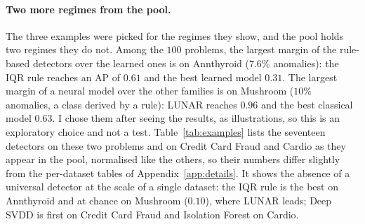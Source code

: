 \documentclass[conference]{IEEEtran}
\begin{document}
\paragraph{Two more regimes from the pool.} The three examples were
picked for the regimes they show, and the pool holds two regimes they do not. Among the
$100$ problems, the largest margin of the rule-based detectors over the learned ones is on
Annthyroid ($7.6\%$ anomalies): the IQR rule reaches an AP of $0.61$ and the best learned
model $0.31$. The largest margin of a neural model over the other families is on Mushroom
($10\%$ anomalies, a class derived by a rule): LUNAR reaches $0.96$ and the best classical
model $0.63$. I chose them after seeing the results, as illustrations, so this is an
exploratory choice and not a test. Table~\ref{tab:examples} lists the seventeen detectors on
these two problems and on Credit Card Fraud and Cardio as they appear in the pool, normalised
like the others, so their numbers differ slightly from the per-dataset tables of Appendix~\ref{app:details}. It shows the
absence of a universal detector at the scale of a single dataset: the IQR rule is the best on
Annthyroid and at chance on Mushroom ($0.10$), where LUNAR leads; Deep SVDD is first on
Credit Card Fraud and Isolation Forest on Cardio.
\end{document}
